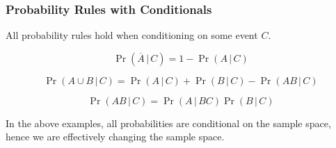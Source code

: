 \documentclass{article}
\begin{document}
\subsubsection{Probability Rules with Conditionals}
All probability rules hold when conditioning on some event \(C\).
\begin{theorem}
    \begin{equation*}
        \Pr{\left( \overline{A} \,\vert\, C \right)} = 1 - \Pr{\left( A \,\vert\, C \right)}
    \end{equation*}
\end{theorem}
\begin{theorem}
    \begin{equation*}
        \Pr{\left( A \cup B \,\vert\, C \right)} = \Pr{\left( A \,\vert\, C \right)} + \Pr{\left( B \,\vert\, C \right)} - \Pr{\left( AB \,\vert\, C \right)}
    \end{equation*}
\end{theorem}
\begin{theorem}
    \begin{equation*}
        \Pr{\left( A B \,\vert\, C \right)} = \Pr{\left( A \,\vert\, BC \right)} \Pr{\left( B \,\vert\, C \right)}
    \end{equation*}
\end{theorem}
In the above examples, all probabilities are conditional on the sample space, hence we are effectively
changing the sample space.
\end{document}
